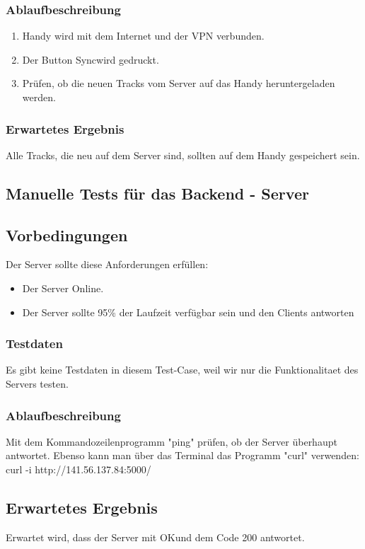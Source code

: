 \documentclass{article}
\begin{document}
\subsubsection{Ablaufbeschreibung}
	\begin{enumerate}
		\item Handy wird mit dem Internet und der VPN verbunden.
		\item Der Button \glqq Sync\grqq\space wird gedruckt.
		\item Prüfen, ob die neuen Tracks vom Server auf das Handy heruntergeladen werden.
	\end{enumerate}
\subsubsection{Erwartetes Ergebnis}
	Alle Tracks, die neu auf dem Server sind, sollten auf dem Handy gespeichert sein.

\subsection{Manuelle Tests für das Backend - Server}
\subsection{Vorbedingungen}
	Der Server sollte diese Anforderungen erfüllen:
		\begin{itemize}
			\item Der Server Online.
			\item Der Server sollte 95\% der Laufzeit verfügbar sein und den Clients antworten
		\end{itemize}
\subsubsection{Testdaten}
	Es gibt keine Testdaten in diesem Test-Case, weil wir nur die Funktionalitaet des Servers testen.
\subsubsection{Ablaufbeschreibung}
	Mit dem Kommandozeilenprogramm "ping" prüfen, ob der Server überhaupt antwortet. Ebenso kann man über das Terminal das Programm "curl" verwenden: curl -i http://141.56.137.84:5000/
\subsection{Erwartetes Ergebnis}
	Erwartet wird, dass der Server mit \glqq OK\grqq\space und dem Code 200 antwortet.
	
\end{document}
